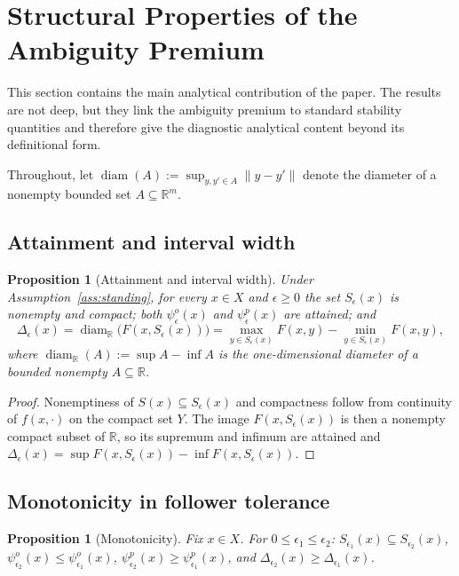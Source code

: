 \documentclass[11pt]{article}
\newtheorem{proposition}[theorem]{Proposition}
\theoremstyle{definition}
\newcommand{\R}{\mathbb{R}}
\newcommand{\eps}{\epsilon}
\DeclareMathOperator{\diam}{diam}
\begin{document}
\section{Structural Properties of the Ambiguity Premium}
\label{sec:theory}
This section contains the main analytical contribution of the
paper. The results are not deep, but they link the ambiguity
premium to standard stability quantities and therefore give the
diagnostic analytical content beyond its definitional form.

Throughout, let $\diam(A):=\sup_{y,y'\in A}\|y-y'\|$ denote the
diameter of a nonempty bounded set $A\subseteq\R^m$.

\subsection{Attainment and interval width}
\label{sec:theory-attain}
\begin{proposition}[Attainment and interval width]\label{prop:attain}
Under Assumption~\ref{ass:standing}, for every $x\in X$ and
$\eps\ge 0$ the set $S_\eps(x)$ is nonempty and compact; both
$\psi_\eps^o(x)$ and $\psi_\eps^p(x)$ are attained; and
\begin{equation}\label{eq:interval}
  \Delta_\eps(x)
  =\diam_\R\bigl(F(x,S_\eps(x))\bigr)
  =\max_{y\in S_\eps(x)}F(x,y)-\min_{y\in S_\eps(x)}F(x,y),
\end{equation}
where $\diam_\R(A):=\sup A-\inf A$ is the one-dimensional diameter
of a bounded nonempty $A\subseteq\R$.
\end{proposition}

\begin{proof}
Nonemptiness of $S(x)\subseteq S_\eps(x)$ and compactness follow
from continuity of $f(x,\cdot)$ on the compact set $Y$. The
image $F(x,S_\eps(x))$ is then a nonempty compact subset of $\R$,
so its supremum and infimum are attained and
$\Delta_\eps(x)=\sup F(x,S_\eps(x))-\inf F(x,S_\eps(x))$.
\end{proof}

\subsection{Monotonicity in follower tolerance}
\begin{proposition}[Monotonicity]\label{prop:monotone}
Fix $x\in X$. For $0\le\eps_1\le\eps_2$:
$S_{\eps_1}(x)\subseteq S_{\eps_2}(x)$,
$\psi_{\eps_2}^o(x)\le\psi_{\eps_1}^o(x)$,
$\psi_{\eps_2}^p(x)\ge\psi_{\eps_1}^p(x)$, and
$\Delta_{\eps_2}(x)\ge\Delta_{\eps_1}(x)$.
\end{proposition}
\end{document}
